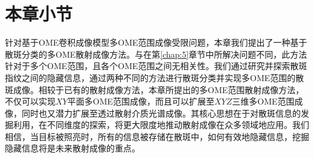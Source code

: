 \section{本章小节}
针对基于OME卷积成像模型多OME范围成像受限问题，本章我们提出了一种基于散斑分类的多OME散射成像方法。与在第\ref{chap:5}章节中所解决问题不同，此方法针对于多个OME范围，且各个OME范围之间无相关性。我们通过研究并探索散斑指纹之间的隐藏信息，通过两种不同的方法进行散斑分类并实现多OME范围的散斑成像。相较于已有的散射成像方法，本章所提出的多OME范围散射成像方法，不仅可以实现$XY$平面多OME范围成像，而且可以扩展至$XYZ$三维多OME范围成像，同时也又潜力扩展至透过散射介质光谱成像。其核心思想在于对散斑信息的发掘利用，在不同维度的探索，将更大限度地推动散射成像在众多领域地应用。我们相信，当目标被照亮时，所有的信息被存储在散斑中，如何有效地隐藏信息，挖掘隐藏信息将是未来散射成像的重点。

